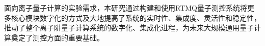 \begin{conclusion}

面向离子量子计算的实验需求，本研究通过构建和使用RTMQ量子测控系统将更多核心模块数字化的方式及大地提高了系统的实时性、集成度、灵活性和稳定性，推动了整个离子阱量子计算系统的数字化、集成化进程，为未来大规模通用量子计算奠定了测控方面的重要基础。

\end{conclusion}



